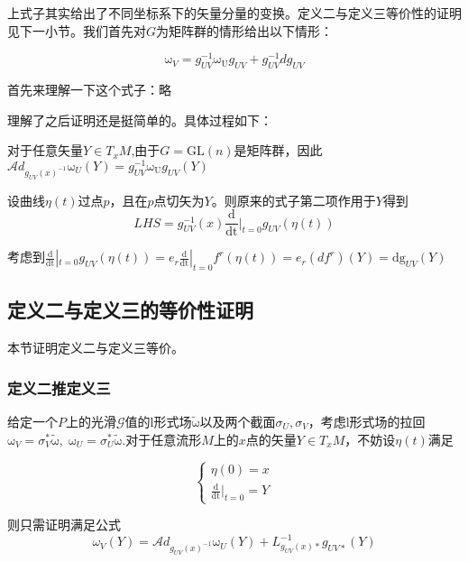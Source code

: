 \documentclass{ctexbook}
\begin{document}
上式子其实给出了不同坐标系下的矢量分量的变换。定义二与定义三等价性的证明见下一小节。我们首先对$G$为矩阵群的情形给出以下情形：

\begin{equation}
    \mathrm{\omega}_V=g_{UV}^{-1}\mathrm{\omega_{U}}g_{UV}+g_{UV}^{-1}d g_{UV}
\end{equation}

首先来理解一下这个式子：略

理解了之后证明还是挺简单的。具体过程如下：

对于任意矢量$Y\in T_x M$,由于$G=\mathrm{GL}(n)$是矩阵群，因此$\mathscr{A}d_{g_{UV}(x)^{-1}}\mathrm{\omega}_U(Y)=g_{UV}^{-1}\mathrm{\omega_{U}}g_{UV}(Y)$

设曲线$\eta(t)$过点$p$，且在$p$点切矢为$Y$。则原来的式子第二项作用于$Y$得到
\begin{equation}
    LHS=g_{UV}^{-1}(x)\frac{\mathrm{d}}{\mathrm{dt}}|_{t=0}g_{UV}(\eta(t))
\end{equation}

考虑到$\frac{\mathrm{d}}{\mathrm{dt}}|_{t=0}g_{UV}(\eta(t))=e_r\frac{\mathrm{d}}{\mathrm{dt}}|_{t=0}f^{r}(\eta(t))=e_r(df^r)(Y)=\mathrm{dg}_{UV}(Y)$

\subsection{定义二与定义三的等价性证明}
本节证明定义二与定义三等价。

\subsubsection{定义二推定义三}
给定一个$P$上的光滑$\mathscr{G}$值的$\mathrm{l}$形式场$\tilde{\mathrm{\omega}}$以及两个截面$\sigma_U,\sigma_V$，考虑$\mathrm{l}$形式场的拉回$\mathrm{\omega}_V=\sigma_V^{*}\tilde{\mathrm{\omega}},\;\mathrm{\omega}_U=\sigma_U^{*}\tilde{\mathrm{\omega}}$.对于任意流形$M$上的$x$点的矢量$Y\in T_x M$，不妨设$\eta(t)$满足

\begin{equation}
    \begin{cases}
        \eta(0)=x\\
        \frac{\mathrm{d}}{\mathrm{dt}}|_{t=0}=Y
    \end{cases}
\end{equation}

则只需证明满足公式
\begin{equation*}
    \mathscr{\omega}_V(Y)=\mathscr{A}d_{g_{UV}(x)^{-1}}\mathrm{\omega}_U(Y)+L^{-1}_{g_{UV}(x)*}g_{UV*}(Y) 
\end{equation*}
\end{document}
